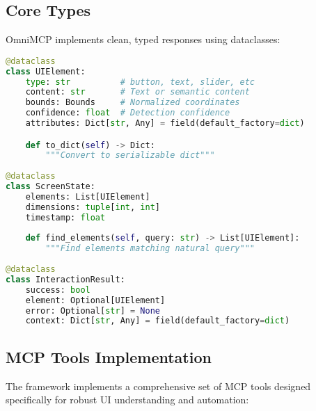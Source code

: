 \documentclass{article}
\begin{document}
\subsection{Core Types}

OmniMCP implements clean, typed responses using dataclasses:

\begin{lstlisting}[language=Python]
@dataclass
class UIElement:
    type: str          # button, text, slider, etc
    content: str       # Text or semantic content
    bounds: Bounds     # Normalized coordinates
    confidence: float  # Detection confidence
    attributes: Dict[str, Any] = field(default_factory=dict)

    def to_dict(self) -> Dict:
        """Convert to serializable dict"""
    
@dataclass
class ScreenState:
    elements: List[UIElement]
    dimensions: tuple[int, int]
    timestamp: float
    
    def find_elements(self, query: str) -> List[UIElement]:
        """Find elements matching natural query"""
    
@dataclass
class InteractionResult:
    success: bool
    element: Optional[UIElement]
    error: Optional[str] = None
    context: Dict[str, Any] = field(default_factory=dict)
\end{lstlisting}

\subsection{MCP Tools Implementation}

The framework implements a comprehensive set of MCP tools designed specifically for robust UI understanding and automation:
\end{document}
